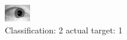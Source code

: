 \begin{figure}[h!]
\begin{center}
\includegraphics[width=0.60\columnwidth]{figures/ID1486_class_2_target_1.png}
\end{center}
\caption{ Classification: 2 actual target: 1}
\label{fig:ID1486_class_2_target_1}
\end{figure}
